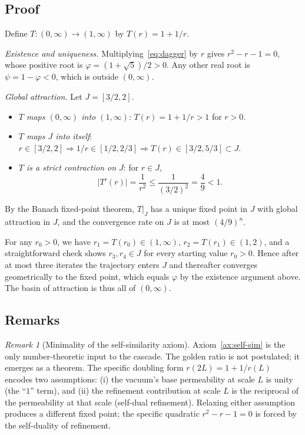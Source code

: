 \documentclass[12pt]{article}
\theoremstyle{definition}
\theoremstyle{remark}
\newtheorem{remark}[theorem]{Remark}
\begin{document}
\subsection{Proof}

Define $T : (0, \infty) \to (1, \infty)$ by $T(r) = 1 + 1/r$.

\emph{Existence and uniqueness.} Multiplying~\eqref{eq:dagger} by $r$ gives $r^2 - r - 1 = 0$, whose positive root is $\varphi = (1 + \sqrt{5})/2 > 0$. Any other real root is $\psi = 1 - \varphi < 0$, which is outside $(0, \infty)$.

\emph{Global attraction.} Let $J = [3/2, 2]$.
\begin{itemize}
\item \emph{$T$ maps $(0, \infty)$ into $(1, \infty)$}: $T(r) = 1 + 1/r > 1$ for $r > 0$.
\item \emph{$T$ maps $J$ into itself}: $r \in [3/2, 2] \Rightarrow 1/r \in [1/2, 2/3] \Rightarrow T(r) \in [3/2, 5/3] \subset J$.
\item \emph{$T$ is a strict contraction on $J$}: for $r \in J$,
\[
|T'(r)| = \frac{1}{r^2} \le \frac{1}{(3/2)^2} = \frac{4}{9} < 1.
\]
\end{itemize}
By the Banach fixed-point theorem, $T|_J$ has a unique fixed point in $J$ with global attraction in $J$, and the convergence rate on $J$ is at most $(4/9)^n$.

For any $r_0 > 0$, we have $r_1 = T(r_0) \in (1, \infty)$, $r_2 = T(r_1) \in (1, 2)$, and a straightforward check shows $r_3, r_4 \in J$ for every starting value $r_0 > 0$. Hence after at most three iterates the trajectory enters $J$ and thereafter converges geometrically to the fixed point, which equals $\varphi$ by the existence argument above. The basin of attraction is thus all of $(0, \infty)$.

\subsection{Remarks}

\begin{remark}[Minimality of the self-similarity axiom]
Axiom~\ref{ax:self-sim} is the only number-theoretic input to the cascade. The golden ratio is not postulated; it emerges as a theorem. The specific doubling form $r(2L) = 1 + 1/r(L)$ encodes two assumptions: (i) the vacuum's base permeability at scale $L$ is unity (the ``$1$'' term), and (ii) the refinement contribution at scale $L$ is the reciprocal of the permeability at that scale (self-dual refinement). Relaxing either assumption produces a different fixed point; the specific quadratic $r^2 - r - 1 = 0$ is forced by the self-duality of refinement.
\end{remark}
\end{document}
